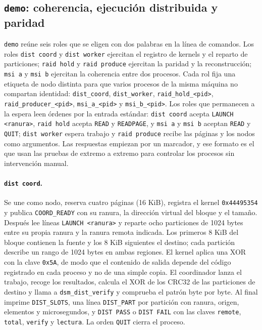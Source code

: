 \subsection{\texttt{demo}: coherencia, ejecución distribuida y paridad}\label{sec:demo}

\texttt{demo} reúne seis roles que se eligen con dos palabras en la línea de comandos. Los roles \texttt{dist coord} y \texttt{dist worker} ejercitan el registro de kernels y el reparto de particiones; \texttt{raid hold} y \texttt{raid produce} ejercitan la paridad y la reconstrucción; \texttt{msi a} y \texttt{msi b} ejercitan la coherencia entre dos procesos. Cada rol fija una etiqueta de nodo distinta para que varios procesos de la misma máquina no compartan identidad: \texttt{dist\_coord}, \texttt{dist\_worker}, \texttt{raid\_hold\_<pid>}, \texttt{raid\_producer\_<pid>}, \texttt{msi\_a\_<pid>} y \texttt{msi\_b\_<pid>}. Los roles que permanecen a la espera leen órdenes por la entrada estándar: \texttt{dist coord} acepta \texttt{LAUNCH <ranura>}, \texttt{raid hold} acepta \texttt{READ} y \texttt{READPAGE}, y \texttt{msi a} y \texttt{msi b} aceptan \texttt{READ} y \texttt{QUIT}; \texttt{dist worker} espera trabajo y \texttt{raid produce} recibe las páginas y los nodos como argumentos. Las respuestas empiezan por un marcador, y ese formato es el que usan las pruebas de extremo a extremo para controlar los procesos sin intervención manual.

\paragraph{\texttt{dist coord}.} Se une como nodo, reserva cuatro páginas (16 KiB), registra el kernel \texttt{0x44495354} y publica \texttt{COORD\_READY} con su ranura, la dirección virtual del bloque y el tamaño. Después lee líneas \texttt{LAUNCH <ranura>} y reparte ocho particiones de 1024 bytes entre su propia ranura y la ranura remota indicada. Los primeros 8 KiB del bloque contienen la fuente y los 8 KiB siguientes el destino; cada partición describe un rango de 1024 bytes en ambas regiones. El kernel aplica una XOR con la clave \texttt{0x5A}, de modo que el contenido de salida depende del código registrado en cada proceso y no de una simple copia. El coordinador lanza el trabajo, recoge los resultados, calcula el XOR de los CRC32 de las particiones de destino y llama a \texttt{dsm\_dist\_verify} y comprueba el patrón byte por byte. Al final imprime \texttt{DIST\_SLOTS}, una línea \texttt{DIST\_PART} por partición con ranura, origen, elementos y microsegundos, y \texttt{DIST PASS} o \texttt{DIST FAIL} con las claves \texttt{remote}, \texttt{total}, \texttt{verify} y \texttt{lectura}. La orden \texttt{QUIT} cierra el proceso.

